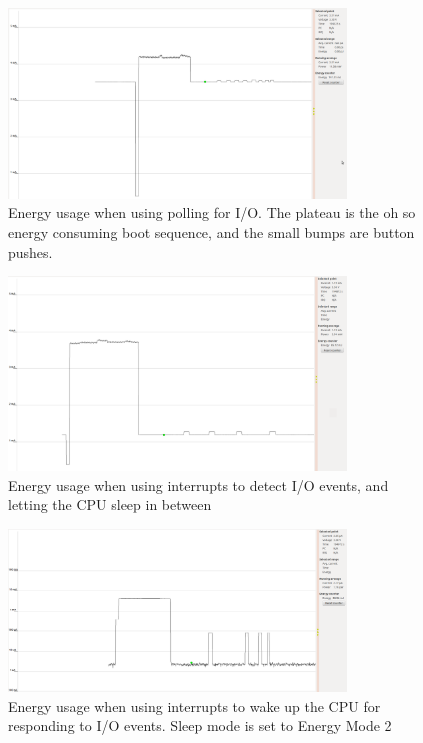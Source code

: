 \begin{figure}[ht!]
    \begin{center}
    \includegraphics[width=0.8\textwidth]{assets/img/polling.png}
    \caption{Energy usage when using polling for I/O. The plateau is the oh so energy consuming boot sequence, and the small bumps are button pushes.}
    \label{fig:polling_io}
    \end{center}
\end{figure}

\begin{figure}[ht!]
    \begin{center}
    \includegraphics[width=0.8\textwidth]{assets/img/interrupt_regular_sleep.png}
    \caption{Energy usage when using interrupts to detect I/O events, and letting the CPU sleep in between}
    \label{fig:interrupt_io}
    \end{center}
\end{figure}

\begin{figure}[ht!]
    \begin{center}
    \includegraphics[width=0.8\textwidth]{assets/img/interrupt_deep_sleep.png}
    \caption{Energy usage when using interrupts to wake up the CPU for responding to I/O events. Sleep mode is set to Energy Mode 2}
    \label{fig:interrupt_io_deep_sleep}
    \end{center}
\end{figure}
